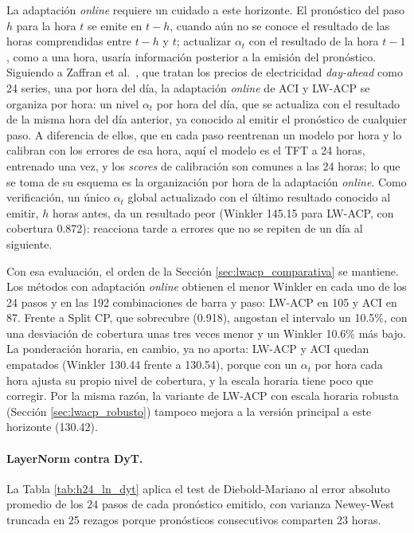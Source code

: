 La adaptación \textit{online} requiere un cuidado a este horizonte. El pronóstico del paso $h$ para la hora $t$ se emite en $t-h$, cuando aún no se conoce el resultado de las horas comprendidas entre $t-h$ y $t$; actualizar $\alpha_t$ con el resultado de la hora $t-1$, como a una hora, usaría información posterior a la emisión del pronóstico. Siguiendo a Zaffran et al.\ \cite{ZaffranICML2022}, que tratan los precios de electricidad \textit{day-ahead} como 24 series, una por hora del día, la adaptación \textit{online} de ACI y LW-ACP se organiza por hora: un nivel $\alpha_t$ por hora del día, que se actualiza con el resultado de la misma hora del día anterior, ya conocido al emitir el pronóstico de cualquier paso. A diferencia de ellos, que en cada paso reentrenan un modelo por hora y lo calibran con los errores de esa hora, aquí el modelo es el TFT a 24 horas, entrenado una vez, y los \textit{scores} de calibración son comunes a las 24 horas; lo que se toma de su esquema es la organización por hora de la adaptación \textit{online}. Como verificación, un único $\alpha_t$ global actualizado con el último resultado conocido al emitir, $h$ horas antes, da un resultado peor (Winkler 145.15 para LW-ACP, con cobertura 0.872): reacciona tarde a errores que no se repiten de un día al siguiente.

Con esa evaluación, el orden de la Sección \ref{sec:lwacp_comparativa} se mantiene. Los métodos con adaptación \textit{online} obtienen el menor Winkler en cada uno de los 24 pasos y en las 192 combinaciones de barra y paso: LW-ACP en 105 y ACI en 87. Frente a Split CP, que sobrecubre (0.918), angostan el intervalo un 10.5\%, con una desviación de cobertura unas tres veces menor y un Winkler 10.6\% más bajo. La ponderación horaria, en cambio, ya no aporta: LW-ACP y ACI quedan empatados (Winkler 130.44 frente a 130.54), porque con un $\alpha_t$ por hora cada hora ajusta su propio nivel de cobertura, y la escala horaria tiene poco que corregir. Por la misma razón, la variante de LW-ACP con escala horaria robusta (Sección \ref{sec:lwacp_robusto}) tampoco mejora a la versión principal a este horizonte (130.42).

\paragraph{LayerNorm contra DyT.} La Tabla \ref{tab:h24_ln_dyt} aplica el test de Diebold-Mariano al error absoluto promedio de los 24 pasos de cada pronóstico emitido, con varianza Newey-West truncada en 25 rezagos porque pronósticos consecutivos comparten 23 horas.

